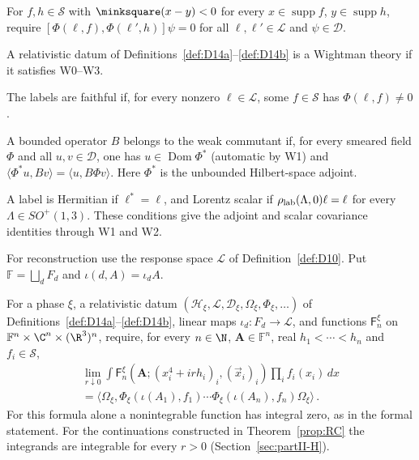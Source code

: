 \begin{definition}[W3. Locality]\label{def:W3}
For $f,h\in\mathcal S$ with $\minksquare(x-y)<0$ for every $x\in\operatorname{supp}f$, $y\in\operatorname{supp}h$, require $[\Phi(\ell,f),\Phi(\ell',h)]\psi=0$ for all $\ell,\ell'\in\mathcal L$ and $\psi\in\mathcal D$.
\end{definition}

\begin{definition}\label{def:wightman}
A relativistic datum of Definitions~\ref{def:D14a}--\ref{def:D14b} is a Wightman theory if it satisfies W0--W3.
\end{definition}

\begin{definition}\label{def:D14c}
The labels are faithful if, for every nonzero $\ell\in\mathcal L$, some $f\in\mathcal S$ has $\Phi(\ell,f)\ne0$.
\end{definition}

\begin{definition}\label{def:D14d}
A bounded operator $B$ belongs to the weak commutant if, for every smeared field $\Phi$ and all $u,v\in\mathcal D$, one has $u\in\operatorname{Dom}\Phi^*$ (automatic by W1) and $\langle\Phi^*u,Bv\rangle=\langle u,B\Phi v\rangle$. Here $\Phi^*$ is the unbounded Hilbert-space adjoint.
\end{definition}

\begin{definition}\label{def:D14e}
A label is Hermitian if $\ell^*=\ell$, and Lorentz scalar if $\rho_{\rm lab}(\Lambda,0)\ell=\ell$ for every $\Lambda\in SO^+(1,3)$. These conditions give the adjoint and scalar covariance identities through W1 and W2.
\end{definition}

For reconstruction use the response space $\mathcal L$ of Definition~\ref{def:D10}. Put $\mathbb F=\bigsqcup_dF_d$ and $\iota(d,A)=\iota_dA$.

\begin{definition}\label{def:D14f}
For a phase $\xi$, a relativistic datum $(\mathcal H_\xi,\mathcal L,\mathcal D_\xi,\Omega_\xi,\Phi_\xi,\ldots)$ of Definitions~\ref{def:D14a}--\ref{def:D14b}, linear maps $\iota_d:F_d\to\mathcal L$, and functions $\mathsf F_n^\xi$ on $\mathbb F^n\times\C^n\times(\R^3)^n$, require, for every $n\in\N$, $\boldsymbol A\in\mathbb F^n$, real $h_1<\cdots<h_n$ and $f_i\in\mathcal S$,
\begin{multline*}
\lim_{r\downarrow0}\int\mathsf F_n^\xi(\boldsymbol A;(x_i^4+irh_i)_i,(\vec x_i)_i)\prod_i f_i(x_i)\,dx\\
=\langle\Omega_\xi,\Phi_\xi(\iota(A_1),f_1)\cdots\Phi_\xi(\iota(A_n),f_n)\Omega_\xi\rangle\,.
\end{multline*}
For this formula alone a nonintegrable function has integral zero, as in the formal statement. For the continuations constructed in Theorem~\ref{prop:RC} the integrands are integrable for every $r>0$ (Section~\ref{sec:partII-H}).
\end{definition}

